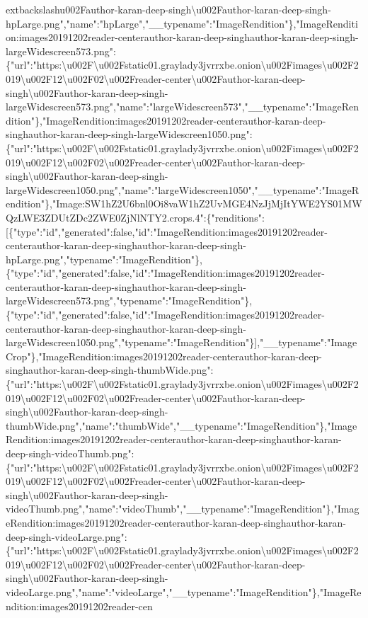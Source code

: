 extbackslash{}u002Fauthor-karan-deep-singh\textbackslash{}u002Fauthor-karan-deep-singh-hpLarge.png","name":"hpLarge","\_\_typename":"ImageRendition"\},"ImageRendition:images20191202reader-centerauthor-karan-deep-singhauthor-karan-deep-singh-largeWidescreen573.png":\{"url":"https:\textbackslash{}u002F\textbackslash{}u002Fstatic01.graylady3jvrrxbe.onion\textbackslash{}u002Fimages\textbackslash{}u002F2019\textbackslash{}u002F12\textbackslash{}u002F02\textbackslash{}u002Freader-center\textbackslash{}u002Fauthor-karan-deep-singh\textbackslash{}u002Fauthor-karan-deep-singh-largeWidescreen573.png","name":"largeWidescreen573","\_\_typename":"ImageRendition"\},"ImageRendition:images20191202reader-centerauthor-karan-deep-singhauthor-karan-deep-singh-largeWidescreen1050.png":\{"url":"https:\textbackslash{}u002F\textbackslash{}u002Fstatic01.graylady3jvrrxbe.onion\textbackslash{}u002Fimages\textbackslash{}u002F2019\textbackslash{}u002F12\textbackslash{}u002F02\textbackslash{}u002Freader-center\textbackslash{}u002Fauthor-karan-deep-singh\textbackslash{}u002Fauthor-karan-deep-singh-largeWidescreen1050.png","name":"largeWidescreen1050","\_\_typename":"ImageRendition"\},"Image:SW1hZ2U6bnl0Oi8vaW1hZ2UvMGE4NzJjMjItYWE2YS01MWQzLWE3ZDUtZDc2ZWE0ZjNlNTY2.crops.4":\{"renditions":{[}\{"type":"id","generated":false,"id":"ImageRendition:images20191202reader-centerauthor-karan-deep-singhauthor-karan-deep-singh-hpLarge.png","typename":"ImageRendition"\},\{"type":"id","generated":false,"id":"ImageRendition:images20191202reader-centerauthor-karan-deep-singhauthor-karan-deep-singh-largeWidescreen573.png","typename":"ImageRendition"\},\{"type":"id","generated":false,"id":"ImageRendition:images20191202reader-centerauthor-karan-deep-singhauthor-karan-deep-singh-largeWidescreen1050.png","typename":"ImageRendition"\}{]},"\_\_typename":"ImageCrop"\},"ImageRendition:images20191202reader-centerauthor-karan-deep-singhauthor-karan-deep-singh-thumbWide.png":\{"url":"https:\textbackslash{}u002F\textbackslash{}u002Fstatic01.graylady3jvrrxbe.onion\textbackslash{}u002Fimages\textbackslash{}u002F2019\textbackslash{}u002F12\textbackslash{}u002F02\textbackslash{}u002Freader-center\textbackslash{}u002Fauthor-karan-deep-singh\textbackslash{}u002Fauthor-karan-deep-singh-thumbWide.png","name":"thumbWide","\_\_typename":"ImageRendition"\},"ImageRendition:images20191202reader-centerauthor-karan-deep-singhauthor-karan-deep-singh-videoThumb.png":\{"url":"https:\textbackslash{}u002F\textbackslash{}u002Fstatic01.graylady3jvrrxbe.onion\textbackslash{}u002Fimages\textbackslash{}u002F2019\textbackslash{}u002F12\textbackslash{}u002F02\textbackslash{}u002Freader-center\textbackslash{}u002Fauthor-karan-deep-singh\textbackslash{}u002Fauthor-karan-deep-singh-videoThumb.png","name":"videoThumb","\_\_typename":"ImageRendition"\},"ImageRendition:images20191202reader-centerauthor-karan-deep-singhauthor-karan-deep-singh-videoLarge.png":\{"url":"https:\textbackslash{}u002F\textbackslash{}u002Fstatic01.graylady3jvrrxbe.onion\textbackslash{}u002Fimages\textbackslash{}u002F2019\textbackslash{}u002F12\textbackslash{}u002F02\textbackslash{}u002Freader-center\textbackslash{}u002Fauthor-karan-deep-singh\textbackslash{}u002Fauthor-karan-deep-singh-videoLarge.png","name":"videoLarge","\_\_typename":"ImageRendition"\},"ImageRendition:images20191202reader-cen